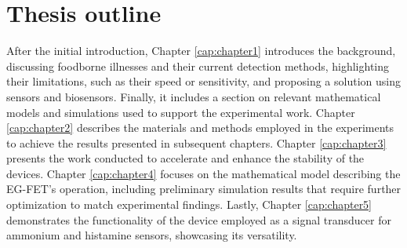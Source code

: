 \section{Thesis outline}

After the initial introduction, Chapter \ref{cap:chapter1} introduces the
background, discussing foodborne illnesses and their current detection methods,
highlighting their limitations, such as their speed or sensitivity, and
proposing a solution using sensors and biosensors. Finally, it includes a
section on relevant mathematical models and simulations used to support the
experimental work. Chapter \ref{cap:chapter2} describes the materials and
methods employed in the experiments to achieve the results presented in
subsequent chapters. Chapter \ref{cap:chapter3} presents the work conducted to
accelerate and enhance the stability of the devices. Chapter \ref{cap:chapter4}
focuses on the mathematical model describing the EG-FET's operation, including
preliminary simulation results that require further optimization to match
experimental findings. Lastly, Chapter \ref{cap:chapter5} demonstrates the
functionality of the device employed as a signal transducer for ammonium and
histamine sensors, showcasing its versatility.

\newpage
\thispagestyle{empty}
\ %
\newpage